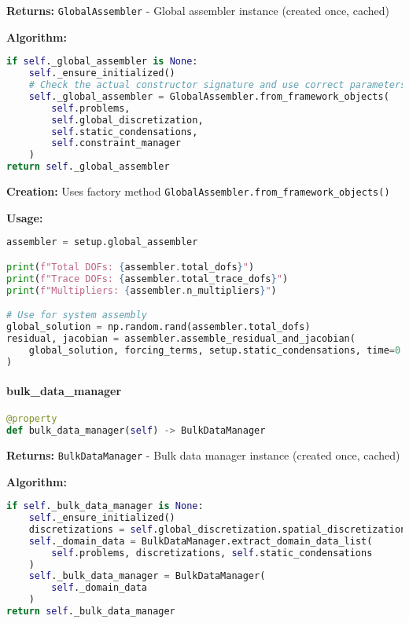 \textbf{Returns:} \texttt{GlobalAssembler} - Global assembler instance (created once, cached)

\textbf{Algorithm:}
\begin{lstlisting}[language=Python, caption=Global Assembler Implementation]
if self._global_assembler is None:
    self._ensure_initialized()
    # Check the actual constructor signature and use correct parameters
    self._global_assembler = GlobalAssembler.from_framework_objects(
        self.problems,
        self.global_discretization,
        self.static_condensations,
        self.constraint_manager
    )
return self._global_assembler
\end{lstlisting}

\textbf{Creation:} Uses factory method \texttt{GlobalAssembler.from\_framework\_objects()}

\textbf{Usage:}
\begin{lstlisting}[language=Python, caption=Global Assembler Usage]
assembler = setup.global_assembler

print(f"Total DOFs: {assembler.total_dofs}")
print(f"Trace DOFs: {assembler.total_trace_dofs}")
print(f"Multipliers: {assembler.n_multipliers}")

# Use for system assembly
global_solution = np.random.rand(assembler.total_dofs)
residual, jacobian = assembler.assemble_residual_and_jacobian(
    global_solution, forcing_terms, setup.static_condensations, time=0.0
)
\end{lstlisting}

\paragraph{bulk\_data\_manager}
\begin{lstlisting}[language=Python, caption=Bulk Data Manager Property]
@property
def bulk_data_manager(self) -> BulkDataManager
\end{lstlisting}

\textbf{Returns:} \texttt{BulkDataManager} - Bulk data manager instance (created once, cached)

\textbf{Algorithm:}
\begin{lstlisting}[language=Python, caption=Bulk Data Manager Implementation]
if self._bulk_data_manager is None:
    self._ensure_initialized()
    discretizations = self.global_discretization.spatial_discretizations
    self._domain_data = BulkDataManager.extract_domain_data_list(
        self.problems, discretizations, self.static_condensations
    )
    self._bulk_data_manager = BulkDataManager(
        self._domain_data
    )
return self._bulk_data_manager
\end{lstlisting}

